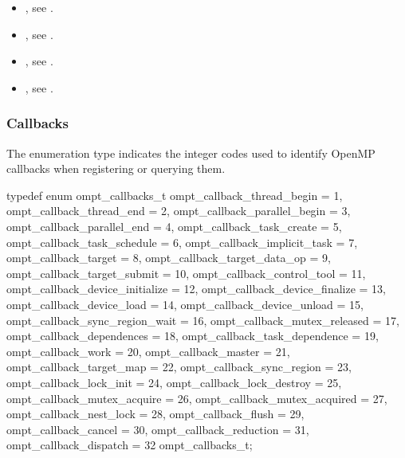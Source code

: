 \crossreferences
\begin{itemize}
\item {}, see .

\item {}, see .

\item {}, see .

\item {}, see .
\end{itemize}

\subsubsection{Callbacks}
\label{sec:ompt_callbacks_t}

\summary
The  enumeration type indicates the integer codes 
used to identify OpenMP callbacks when registering or querying them.

\format
\begin{ccppspecific}
\begin{omptEnum}
typedef enum ompt_callbacks_t {
  ompt_callback_thread_begin             = 1,
  ompt_callback_thread_end               = 2,
  ompt_callback_parallel_begin           = 3,
  ompt_callback_parallel_end             = 4,
  ompt_callback_task_create              = 5,
  ompt_callback_task_schedule            = 6,
  ompt_callback_implicit_task            = 7,
  ompt_callback_target                   = 8,
  ompt_callback_target_data_op           = 9,
  ompt_callback_target_submit            = 10,
  ompt_callback_control_tool             = 11,
  ompt_callback_device_initialize        = 12,
  ompt_callback_device_finalize          = 13,
  ompt_callback_device_load              = 14,
  ompt_callback_device_unload            = 15,
  ompt_callback_sync_region_wait         = 16,
  ompt_callback_mutex_released           = 17,
  ompt_callback_dependences              = 18,
  ompt_callback_task_dependence          = 19,
  ompt_callback_work                     = 20,
  ompt_callback_master                   = 21,
  ompt_callback_target_map               = 22,
  ompt_callback_sync_region              = 23,
  ompt_callback_lock_init                = 24,
  ompt_callback_lock_destroy             = 25,
  ompt_callback_mutex_acquire            = 26,
  ompt_callback_mutex_acquired           = 27,
  ompt_callback_nest_lock                = 28,
  ompt_callback_flush                    = 29,
  ompt_callback_cancel                   = 30,
  ompt_callback_reduction                = 31,
  ompt_callback_dispatch                 = 32
} ompt_callbacks_t;
\end{omptEnum}
\end{ccppspecific}




